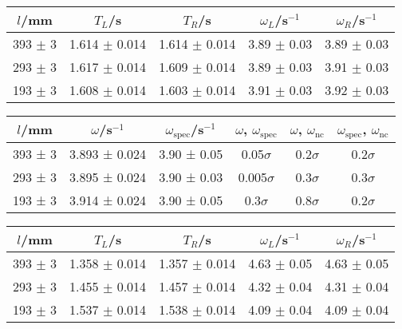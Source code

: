 \documentclass[12pt,a4paper,german]{scrartcl}
\begin{document}
  \begin{center}
    \begin{tabular}{c|c|c|c|c}
      $l$/mm & $T_L$/s & $T_R$/s & $\omega_L$/s$^{-1}$ &$\omega_R$/s$^{-1}$ \\
      \hline
      393 $\pm$ 3 & 1.614 $\pm$ 0.014 & 1.614 $\pm$ 0.014 & 3.89 $\pm$ 0.03 & 3.89 $\pm$ 0.03  \\
      293 $\pm$ 3 & 1.617 $\pm$ 0.014 & 1.609 $\pm$ 0.014 & 3.89 $\pm$ 0.03 & 3.91 $\pm$ 0.03  \\
      193 $\pm$ 3 & 1.608 $\pm$ 0.014 & 1.603 $\pm$ 0.014 & 3.91 $\pm$ 0.03 & 3.92 $\pm$ 0.03
    \end{tabular}
    \label{table_sym_T_omega_left_right}
  \end{center}

  \begin{center}
    \begin{tabular}{c|c|c|c|c|c}
      $l$/mm & $\omega$/s$^{-1}$ & $\omega_\text{spec}$/s$^{-1}$ & $\omega$, $\omega_\text{spec}$ & $\omega$, $\omega_\text{nc}$ & $\omega_\text{spec}$, $\omega_\text{nc}$ \\
      \hline
      393 ± 3 & 3.893 ± 0.024 & 3.90 ± 0.05 &  0.05$\sigma$ & 0.2$\sigma$ & 0.2$\sigma$ \\
      293 ± 3 & 3.895 ± 0.024 & 3.90 ± 0.03 & 0.005$\sigma$ & 0.3$\sigma$ & 0.3$\sigma$ \\
      193 ± 3 & 3.914 ± 0.024 & 3.90 ± 0.05 &   0.3$\sigma$ & 0.8$\sigma$ & 0.2$\sigma$
    \end{tabular}
    \label{table_sym_omega}
  \end{center}

  \begin{center}
    \begin{tabular}{c|c|c|c|c}
      $l$/mm & $T_L$/s & $T_R$/s & $\omega_L$/s$^{-1}$ &$\omega_R$/s$^{-1}$ \\
      \hline
      393 $\pm$ 3 & 1.358 $\pm$ 0.014 & 1.357 $\pm$ 0.014 & 4.63 $\pm$ 0.05 & 4.63 $\pm$ 0.05 \\
      293 $\pm$ 3 & 1.455 $\pm$ 0.014 & 1.457 $\pm$ 0.014 & 4.32 $\pm$ 0.04 & 4.31 $\pm$ 0.04 \\
      193 $\pm$ 3 & 1.537 $\pm$ 0.014 & 1.538 $\pm$ 0.014 & 4.09 $\pm$ 0.04 & 4.09 $\pm$ 0.04
    \end{tabular}
    \label{table_asym_T_omega_left_right}
  \end{center}
\end{document}
